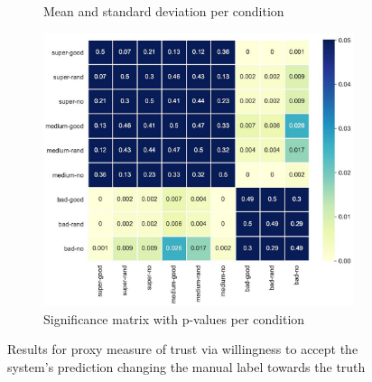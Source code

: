 \begin{figure}[H]
	\begin{subfigure}[b]{0.3\textwidth}
		\caption{Mean and standard deviation per condition}
		\label{tab:results_table_proxy_towards}
	\end{subfigure}
	\begin{subfigure}[b]{0.65\textwidth}
		\includegraphics[width=\textwidth]{img/results_matrix_proxy_towards2.JPG}
		\caption{Significance matrix with p-values per condition}
		\label{fig:results_matrix_proxy_towards}
	\end{subfigure}
	\caption{Results for proxy measure of trust via willingness to accept the system's prediction changing the manual label towards the truth}
	\label{fig:results_proxy_towards}
\end{figure}



